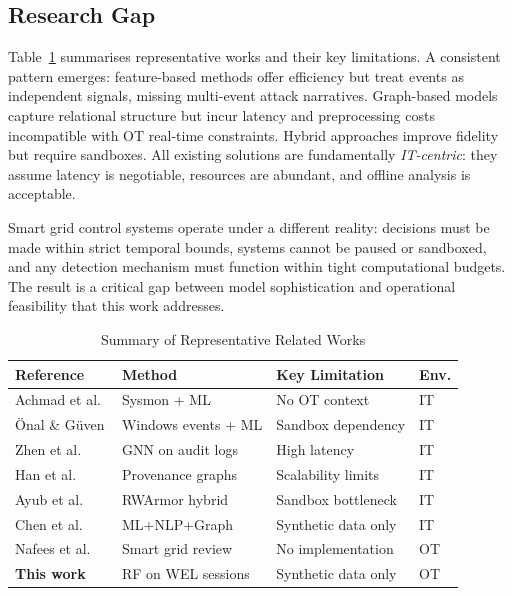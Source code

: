 \subsection{Research Gap}

Table~\ref{tab:related} summarises representative works and their key limitations.
A consistent pattern emerges: feature-based methods offer efficiency but treat events
as independent signals, missing multi-event attack narratives. Graph-based models
capture relational structure but incur latency and preprocessing costs incompatible
with OT real-time constraints. Hybrid approaches improve fidelity but require sandboxes.
All existing solutions are fundamentally \emph{IT-centric}: they assume latency is
negotiable, resources are abundant, and offline analysis is acceptable.

Smart grid control systems operate under a different reality: decisions must be made
within strict temporal bounds, systems cannot be paused or sandboxed, and any detection
mechanism must function within tight computational budgets. The result is a critical gap
between model sophistication and operational feasibility that this work addresses.

\begin{table}[!t]
  \caption{Summary of Representative Related Works}
  \label{tab:related}
  \centering
  \footnotesize
  \begin{tabular}{llll}
    \hline
    Reference & Method & Key Limitation & Env. \\
    \hline
    Achmad et al.\ \cite{achmad2025}   & Sysmon + ML      & No OT context      & IT \\
    \"{O}nal \& G\"{u}ven \cite{onal2025} & Windows events + ML & Sandbox dependency & IT \\
    Zhen et al.\ \cite{zhen2025}       & GNN on audit logs & High latency        & IT \\
    Han et al.\ \cite{han2020}         & Provenance graphs & Scalability limits  & IT \\
    Ayub et al.\ \cite{ayub2023}       & RWArmor hybrid   & Sandbox bottleneck  & IT \\
    Chen et al.\ \cite{chen2022}       & ML+NLP+Graph     & Synthetic data only & IT \\
    Nafees et al.\ \cite{nafees2023}   & Smart grid review & No implementation  & OT \\
    \hline
    \textbf{This work}                 & RF on WEL sessions & Synthetic data only & OT \\
    \hline
  \end{tabular}
\end{table}
